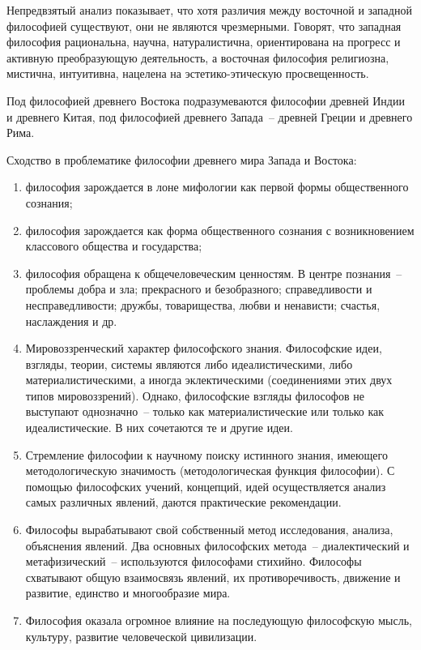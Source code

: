 
Непредвзятый анализ показывает, что хотя различия между восточной и западной философией существуют,
они не являются чрезмерными. Говорят, что западная философия рациональна, научна, натуралистична,
ориентирована на прогресс и активную преобразующую деятельность, а восточная философия религиозна,
мистична, интуитивна, нацелена на эстетико-этическую просвещенность.

Под философией древнего Востока подразумеваются философии древней Индии и древнего Китая, под
философией древнего Запада~-- древней Греции и древнего Рима.

Сходство в проблематике философии древнего мира Запада и Востока:
\begin{enumerate}
    \vspace*{-2ex}
    \itemsep-1ex
    \item философия за­рождается в лоне мифологии как первой формы общественного сознания;
    \item философия зарождается как форма общественного сознания с возникновением классового
        общества и государства;
    \item философия обращена к общечеловеческим ценностям. В центре познания~-- проблемы
        добра и зла; прекрасного и безобразного; справедливости и несправедливости; дружбы,
        товарищества, любви и ненависти; счастья, наслаждения и др.
    \item Мировоззренческий характер философского знания. Философские идеи, взгляды, теории,
        системы являются либо идеалистическими, либо материалистическими, а иногда
        эклектическими (соединениями этих двух типов мировоззрений). Однако, философские
        взгляды философов не выступают однозначно~-- только как материалистические или только
        как идеалистические. В них сочетаются те и другие идеи.
    \item Стремление философии к научному поиску истинного знания, имеющего методологическую
        значимость (методологическая функция философии). С помощью философских учений,
        концепций, идей осуществляется ана­лиз самых раз­личных явлений, даются практические
        рекомендации.
    \item Философы вырабатывают свой собственный метод исследования, ана­лиза, объяснения
        явлений. Два основных философских метода~-- диалектический и метафизический~--
        используются философами стихийно. Философы схватывают общую взаимосвязь явлений, их
        противоречивость, движение и развитие, единство и многообразие мира.
    \item Философия оказала огромное влияние на последующую философ­скую мысль, куль­туру,
        развитие человеческой цивилизации.
    \vspace*{-2ex}
\end{enumerate}

